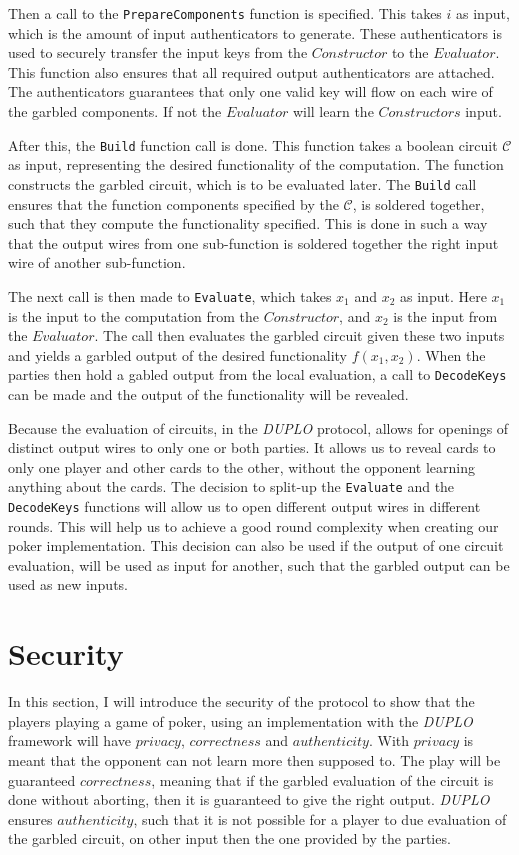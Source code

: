 \documentclass[twoside,11pt,openright]{report}
\newcommand{\DUPLO}{\textit{DUPLO} }
\begin{document}
Then a call to the \verb|PrepareComponents| function is specified. This takes $i$ as input, which is the amount of input authenticators to generate. These authenticators is used to securely transfer the input keys from the $Constructor$ to the $Evaluator$. This function also ensures that all required output authenticators are attached. The authenticators guarantees that only one valid key will flow on each wire of the garbled components. If not the $Evaluator$ will learn the $Constructors$ input.

After this, the \verb|Build| function call is done. This function takes a boolean circuit $\mathcal{C}$ as input, representing the desired functionality of the computation. The function constructs the garbled circuit, which is to be evaluated later. The \verb|Build| call ensures that the function components specified by the $\mathcal{C}$, is soldered together, such that they compute the functionality specified. This is done in such a way that the output wires from one sub-function is soldered together the right input wire of another sub-function. 

The next call is then made to \verb|Evaluate|, which takes $x_1$ and $x_2$ as input. Here $x_1$ is the input to the computation from the $Constructor$, and $x_2$ is the input from the $Evaluator$. The call then  evaluates the garbled circuit given these two inputs and yields a garbled output of the desired functionality $f(x_1,x_2)$. When the parties then hold a gabled output from the local evaluation, a call to \verb|DecodeKeys| can be made and the output of the functionality will be revealed.

\bigskip

Because the evaluation of circuits, in the \DUPLO protocol, allows for openings of distinct output wires to only one or both parties. It allows us to reveal cards to only one player and other cards to the other, without the opponent learning anything about the cards. The decision to split-up the \verb|Evaluate| and the \verb|DecodeKeys| functions will allow us to open different output wires in different rounds. This will help us to achieve a good round complexity when creating our poker implementation. This decision can also be used if the output of one circuit evaluation, will be used as input for another, such that the garbled output can be used as new inputs.


\section{Security}
\label{sec:duplo_secutity}
In this section, I will introduce the security of the protocol to show that the players playing a game of poker, using an implementation with the \DUPLO framework will have $privacy$, $correctness$ and $authenticity$. With $privacy$ is meant that the opponent can not learn more then supposed to. The play will be guaranteed $correctness$, meaning that if the garbled evaluation of the circuit is done without aborting, then it is guaranteed to give the right output. \DUPLO ensures $authenticity$, such that it is not possible for a player to due evaluation of the garbled circuit, on other input then the one provided by the parties.
\end{document}
